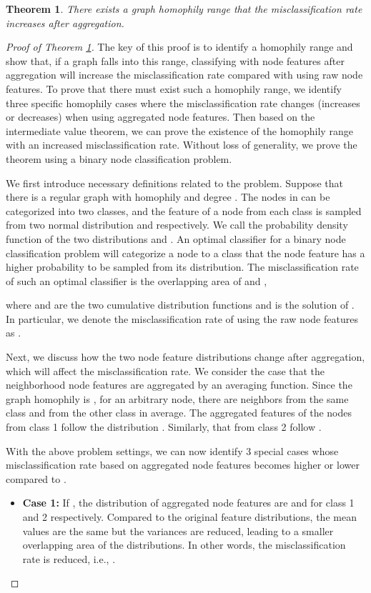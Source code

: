 \documentclass{article}
\theoremstyle{plain}
\newtheorem{theorem}{Theorem}
\begin{document}
\begin{theorem} \label{thm:misclassification}
There exists a graph homophily range that the misclassification rate increases after aggregation.
\end{theorem}
\vspace{-10pt}
\begin{proof}[Proof of Theorem \ref{thm:misclassification}] 
The key of this proof is to identify a homophily range and show that, if a graph falls into this range, classifying with node features after aggregation will increase the misclassification rate compared with using raw node features. 
To prove that there must exist such a homophily range, we identify three specific homophily cases where the misclassification rate changes (increases or decreases) when using aggregated node features. Then based on the intermediate value theorem, we can prove the existence of the homophily range with an increased misclassification rate.
Without loss of generality, we prove the theorem using a binary node classification problem. 


We first introduce necessary definitions related to the problem.
Suppose that there is a regular graph  with homophily  and degree . The nodes  in  can be categorized into two classes, and the feature of a node  from each class is sampled from two normal distribution  and  respectively. We call the probability density function of the two distributions  and .
An optimal classifier for a binary node classification problem will categorize a node to a class that the node feature has a higher probability to be sampled from its distribution. 
The misclassification rate of such an optimal classifier  is the overlapping area of  and ,

where  and  are the two cumulative distribution functions and  is the solution of . In particular, we denote the misclassification rate of using the raw node features as .


Next, we discuss how the two node feature distributions change after aggregation, which will affect the misclassification rate. 
We consider the case that the neighborhood node features are aggregated by an averaging function.
Since the graph homophily is , for an arbitrary node, there are  neighbors from the same class and  from the other class in average.  
The aggregated features of the nodes from class 1 follow the distribution . Similarly, that from class 2 follow .

With the above problem settings, we can now identify 3 special cases  whose misclassification rate based on aggregated node features becomes higher or lower compared to .
\begin{itemize}
    \item \textbf{Case 1:} If , the distribution of aggregated node features are  and  for class 1 and 2 respectively. Compared to the original feature distributions, the mean values are the same but the variances are reduced, leading to a smaller overlapping area of the distributions. In other words, the misclassification rate is reduced, i.e., .


\end{itemize}
\end{proof}
\end{document}
